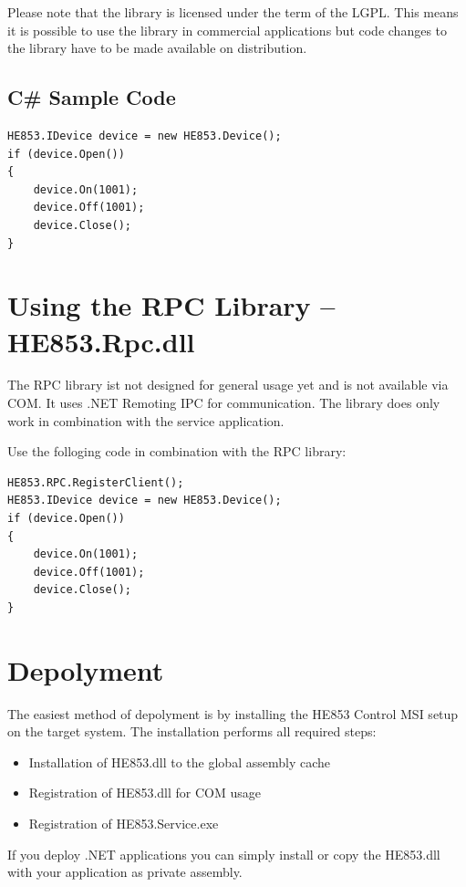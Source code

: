 \documentclass[
a4paper,
oneside,
halfparskip*,
normalheadings,
]
{scrbook}
\begin{document}
Please note that the library is licensed under the term of the LGPL. This means it is
possible to use the library in commercial applications but code changes to the library
have to be made available on distribution.

\subsection{C\# Sample Code}

\begin{verbatim}
HE853.IDevice device = new HE853.Device();
if (device.Open())
{
    device.On(1001);
    device.Off(1001);
    device.Close();
}
\end{verbatim}

\section{Using the RPC Library -- HE853.Rpc.dll}

The RPC library ist not designed for general usage yet and is not available via COM.
It uses .NET Remoting IPC for communication. The library does only work in combination
with the service application.

Use the folloging code in combination with the RPC library:

\begin{verbatim}
HE853.RPC.RegisterClient();
HE853.IDevice device = new HE853.Device();
if (device.Open())
{
    device.On(1001);
    device.Off(1001);
    device.Close();
}
\end{verbatim}

\section{Depolyment}
The easiest method of depolyment is by installing the HE853 Control MSI setup on the target
system. The installation performs all required steps:

\begin{itemize}
  \item Installation of HE853.dll to the global assembly cache
	\item Registration of HE853.dll for COM usage
	\item Registration of HE853.Service.exe
\end{itemize}

If you deploy .NET applications you can simply install or copy the HE853.dll with your application
as private assembly.
\end{document}
